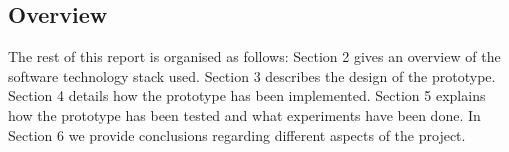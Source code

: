 \subsection{Overview}
The rest of this report is organised as follows:
Section 2 gives an overview of the software technology stack used. 
Section 3 describes the design of the prototype. 
Section 4 details how the prototype has been implemented. 
Section 5 explains how the prototype has been tested and what experiments have been done.  
In Section 6 we provide conclusions regarding different aspects of the project.

